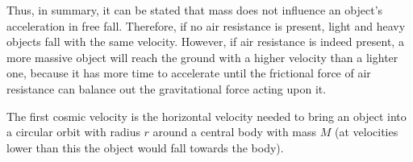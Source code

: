 \begin{figure}[h!]
	\centering
\end{figure}

Thus, in summary, it can be stated that mass does not influence an object's acceleration in free fall. Therefore, if no air resistance is present, light and heavy objects fall with the same velocity. However, if air resistance is indeed present, a more massive object will reach the ground with a higher velocity than a lighter one, because it has more time to accelerate until the frictional force of air resistance can balance out the gravitational force acting upon it. 






The first cosmic velocity is the horizontal velocity needed to bring an object into a circular orbit with radius $r$ around a central body with mass $M$ (at velocities lower than this the object would fall towards the body).





